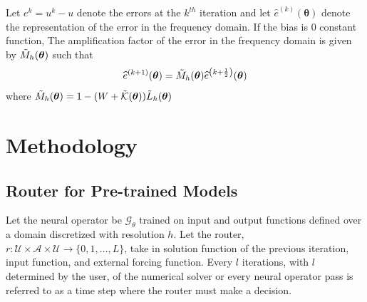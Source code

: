 \documentclass[12pt]{article}
\begin{document}


\begin{lemma}
    Let $e^{k} = u^k - u$ denote the errors at the $k^{th}$ iteration and let $\widehat{e}^{(k)}(\boldsymbol{\theta})$ denote the representation of the error in the frequency domain. If the bias is $0$ constant function, The amplification factor of the error in the frequency domain is given by $\Tilde{M}_{h}(\boldsymbol{\theta})$ such that
    $$\widehat{e}^{(k + 1)}(\boldsymbol{\theta}) = \Tilde{M}_{h}(\boldsymbol{\theta})\widehat{e}^{\left(k + \frac{1}{2}\right)}(\boldsymbol{\theta})$$
    where $\Tilde{M}_{h}(\boldsymbol{\theta}) = 1 - (W + \Tilde{\mathcal{K}}(\boldsymbol{\theta}))\Tilde{L}_h(\boldsymbol{\theta})$
\end{lemma}



\section{Methodology}


\subsection{Router for Pre-trained Models}


Let the neural operator be $\mathcal{G}_{\theta}$ trained on input and output functions defined over a domain discretized with resolution $h$. Let the router, $r: \mathcal{U} \times \mathcal{A} \times \mathcal{U} \to \{0, 1, \ldots, L\}$, take in solution function of the previous iteration, input function, and external forcing function. Every $l$ iterations, with $l$ determined by the user, of the numerical solver or every neural operator pass is referred to as a time step where the router must make a decision. 
\end{document}
